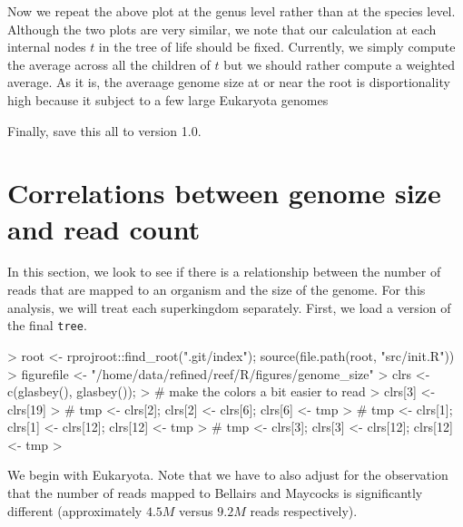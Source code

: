 \documentclass{article}
\begin{document}
Now we repeat the above plot at the genus level rather than at the species level.
Although the two plots are very similar, we note that our calculation at each internal
nodes $t$ in the tree of life should be fixed.
Currently, we simply compute the average across all the children of $t$
but we should rather compute a weighted average.
As it is, the averaage genome size at or near the root is disportionality high because it
subject to a few large Eukaryota genomes

\begin{Schunk}
\end{Schunk}
Finally, save this all to version 1.0.


\section{Correlations between genome size and read count}

In this section, we look to see if there is a relationship between the number of reads that are mapped to an organism
and the size of the genome.
For this analysis, we will treat each superkingdom separately.
First, we load a version of the final {\tt tree}.
\begin{Schunk}
\begin{Sinput}
> root <- rprojroot::find_root(".git/index");  source(file.path(root, "src/init.R"))
> figurefile <- "/home/data/refined/reef/R/figures/genome_size"
>  clrs <- c(glasbey(), glasbey()); 
>   # make the colors a bit easier to read
>  clrs[3] <- clrs[19]
> #  tmp <- clrs[2]; clrs[2] <- clrs[6]; clrs[6] <- tmp
> #  tmp <- clrs[1]; clrs[1] <- clrs[12]; clrs[12] <- tmp
> #  tmp <- clrs[3]; clrs[3] <- clrs[12]; clrs[12] <- tmp
> 
\end{Sinput}
\end{Schunk}


We begin with Eukaryota. 
Note that we have to also adjust for the observation that the number of reads mapped to Bellairs and Maycocks
is significantly different (approximately $4.5M$ versus $9.2M$ reads respectively).
\end{document}
